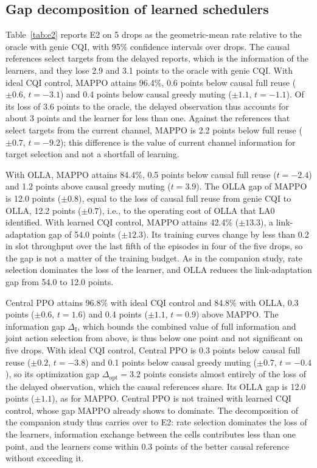 \documentclass{ieeeaccess}
\begin{document}
\subsection{Gap decomposition of learned schedulers}
Table~\ref{tab:e2} reports E2 on 5 drops as the geometric-mean rate relative to the oracle with genie CQI, with 95\% confidence intervals over drops. The causal references select targets from the delayed reports, which is the information of the learners, and they lose 2.9 and 3.1 points to the oracle with genie CQI. With ideal CQI control, MAPPO attains 96.4\%, 0.6 points below causal full reuse ($\pm 0.6$, $t = -3.1$) and 0.4 points below causal greedy muting ($\pm 1.1$, $t = -1.1$). Of its loss of 3.6 points to the oracle, the delayed observation thus accounts for about 3 points and the learner for less than one. Against the references that select targets from the current channel, MAPPO is 2.2 points below full reuse ($\pm 0.7$, $t = -9.2$); this difference is the value of current channel information for target selection and not a shortfall of learning.

With OLLA, MAPPO attains 84.4\%, 0.5 points below causal full reuse ($t = -2.4$) and 1.2 points above causal greedy muting ($t = 3.9$). The OLLA gap of MAPPO is 12.0 points ($\pm 0.8$), equal to the loss of causal full reuse from genie CQI to OLLA, 12.2 points ($\pm 0.7$), i.e., to the operating cost of OLLA that LA0 identified. With learned CQI control, MAPPO attains 42.4\% ($\pm 13.3$), a link-adaptation gap of 54.0 points ($\pm 12.3$). Its training curves change by less than 0.2 in slot throughput over the last fifth of the episodes in four of the five drops, so the gap is not a matter of the training budget. As in the companion study, rate selection dominates the loss of the learner, and OLLA reduces the link-adaptation gap from 54.0 to 12.0 points.

Central PPO attains 96.8\% with ideal CQI control and 84.8\% with OLLA, 0.3 points ($\pm 0.6$, $t = 1.6$) and 0.4 points ($\pm 1.1$, $t = 0.9$) above MAPPO. The information gap $\Delta_{\text{I}}$, which bounds the combined value of full information and joint action selection from above, is thus below one point and not significant on five drops. With ideal CQI control, Central PPO is 0.3 points below causal full reuse ($\pm 0.2$, $t = -3.8$) and 0.1 points below causal greedy muting ($\pm 0.7$, $t = -0.4$), so its optimization gap $\Delta_{\text{opt}} = 3.2$ points consists almost entirely of the loss of the delayed observation, which the causal references share. Its OLLA gap is 12.0 points ($\pm 1.1$), as for MAPPO. Central PPO is not trained with learned CQI control, whose gap MAPPO already shows to dominate. The decomposition of the companion study thus carries over to E2: rate selection dominates the loss of the learners, information exchange between the cells contributes less than one point, and the learners come within 0.3 points of the better causal reference without exceeding it.
\end{document}
